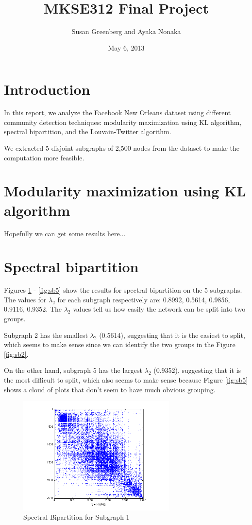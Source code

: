 \documentclass[11pt]{article}
\date{May 6, 2013}
\title{
MKSE312 Final Project
}
\author{
Susan Greenberg and Ayaka Nonaka
}
\begin{document}
\maketitle

\section{Introduction}
In this report, we analyze the Facebook New Orleans dataset using different community detection techniques: modularity maximization using KL algorithm, spectral bipartition, and the Louvain-Twitter algorithm.

We extracted 5 disjoint subgraphs of 2,500 nodes from the dataset to make the computation more feasible.

\section{Modularity maximization using KL algorithm}
Hopefully we can get some results here...

\section{Spectral bipartition}
Figures \ref{fig:sb1} - \ref{fig:sb5} show the results for spectral bipartition on the 5 subgraphs. The values for $\lambda_2$ for each subgraph respectively are: 0.8992, 0.5614, 0.9856, 0.9116, 0.9352. The $\lambda_2$ values tell us how easily the network can be split into two groups.

Subgraph 2 has the smallest $\lambda_2$ (0.5614), suggesting that it is the easiest to split, which seems to make sense since we can identify the two groups in the Figure \ref{fig:sb2}.

On the other hand, subgraph 5 has the largest $\lambda_2$ (0.9352), suggesting that it is the most difficult to split, which also seems to make sense because Figure \ref{fig:sb5} shows a cloud of plots that don't seem to have much obvious grouping.

		 \begin{figure}
		 		\begin{center}
		  		\includegraphics[width=300px]{spectral_partition_a1.png}
		  	\end{center}
		  	\caption{Spectral Bipartition for Subgraph 1}
		  	\label{fig:sb1}
		 \end{figure}
		 
\end{document}
